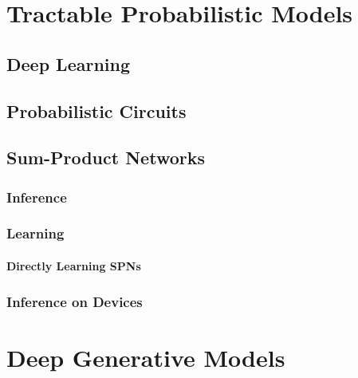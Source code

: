 \chapter{Tractable Probabilistic Models} %

    \section{Deep Learning} %

    \section{Probabilistic Circuits} %

    \section{Sum-Product Networks} %

        \subsection{Inference} %

        \subsection{Learning} %

            \subsubsection{Directly Learning SPNs} %

        \subsection{Inference on Devices} %

\chapter{Deep Generative Models} %

